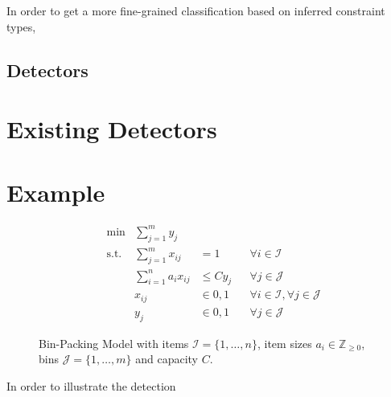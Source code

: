 				In order to get a more fine-grained classification based on inferred constraint types, 
		\clearpage
		
	\subsection{Detectors}
	
	\section{Existing Detectors}
	
	\section{Example}
	\label{chap:gcg:example}
	
		\begin{figure}[ht!]
			\centering
			\begin{align*}
				&\min &\sum_{j=1}^m y_j \\
				&\text{s.t.} &\sum_{j=1}^m x_{ij} &= 1 &&\forall i \in \mathcal{I} \\
				&& \sum_{i=1}^n a_i x_{ij} &\leq C y_j && \forall j \in \mathcal{J} \\
				&& x_{ij} &\in { 0, 1} && \forall i \in \mathcal{I}, \forall j \in \mathcal{J} \\
				&& y_j &\in { 0, 1 } && \forall j \in \mathcal{J}
			\end{align*}
			\caption{Bin-Packing Model with items $\mathcal{I} = \{ 1, \ldots, n \}$, item sizes $a_i \in \mathbb{Z}_{\geq 0}$, bins $\mathcal{J} = \{ 1, \ldots, m \}$ and capacity $C$.}
			\label{figure:gcg:example:binpack}
		\end{figure}
		
		In order to illustrate the detection 
		
		